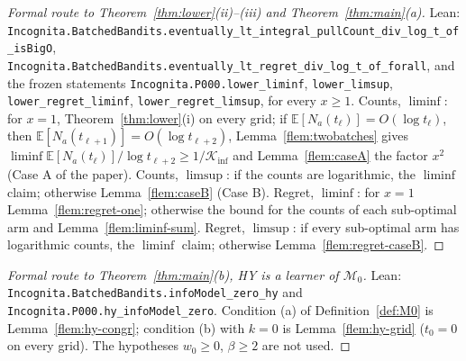 \documentclass[11pt]{article}
\newcommand{\E}{\mathbb{E}}
\newcommand{\Kinf}{\mathcal K_{\inf}}
\begin{document}
\begin{proof}[Formal route to Theorem~\ref{thm:lower}(ii)--(iii) and Theorem~\ref{thm:main}(a)]
Lean: \texttt{Incognita.BatchedBandits.eventually\_lt\_integral\_pullCount\_div\_log\_t\_of\_isBigO},
\texttt{Incognita.BatchedBandits.eventually\_lt\_regret\_div\_log\_t\_of\_forall}, and the frozen
statements \texttt{Incognita.P000.lower\_liminf}, \texttt{lower\_limsup},
\texttt{lower\_regret\_liminf}, \texttt{lower\_regret\_limsup}, for every $x\ge1$. Counts, $\liminf$:
for $x=1$, Theorem~\ref{thm:lower}(i) on every grid; if $\E[N_a(t_\ell)]=O(\log t_\ell)$, then
$\E[N_a(t_{\ell+1})]=O(\log t_{\ell+2})$, Lemma~\ref{flem:twobatches} gives
$\liminf\E[N_a(t_\ell)]/\log t_{\ell+2}\ge1/\Kinf$ and Lemma~\ref{flem:caseA} the factor $x^2$
(Case A of the paper). Counts, $\limsup$: if the counts are logarithmic, the $\liminf$ claim;
otherwise Lemma~\ref{flem:caseB} (Case B). Regret, $\liminf$: for $x=1$
Lemma~\ref{flem:regret-one}; otherwise the bound for the counts of each sub-optimal arm and
Lemma~\ref{flem:liminf-sum}. Regret, $\limsup$: if every sub-optimal arm has logarithmic counts,
the $\liminf$ claim; otherwise Lemma~\ref{flem:regret-caseB}.
\end{proof}

\begin{proof}[Formal route to Theorem~\ref{thm:main}(b), HY is a learner of $\mathcal M_0$]
Lean: \texttt{Incognita.BatchedBandits.infoModel\_zero\_hy} and
\texttt{Incognita.P000.hy\_infoModel\_zero}. Condition (a) of Definition~\ref{def:M0} is
Lemma~\ref{flem:hy-congr}; condition (b) with $k=0$ is Lemma~\ref{flem:hy-grid} ($t_0=0$ on every
grid). The hypotheses $w_0\ge0$, $\beta\ge2$ are not used.
\end{proof}
\end{document}
